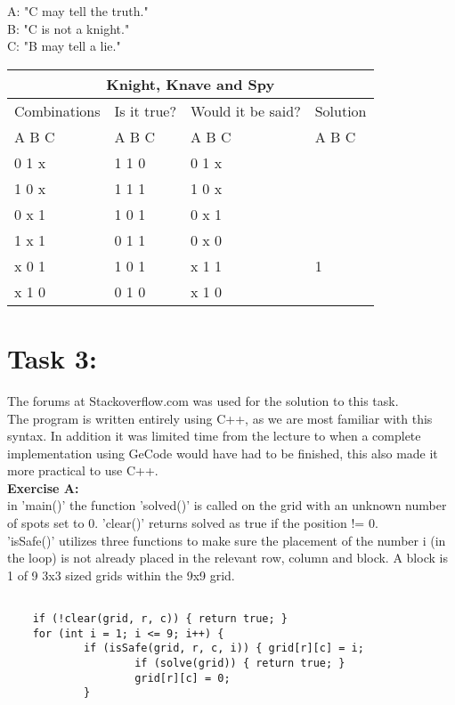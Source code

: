 \documentclass[11pt]{amsart}
\begin{document}
	A: "C may tell the truth."\\
	B: "C is not a knight."\\
	C: "B may tell a lie." \\


\begin{tabular}{ |p{3cm}||p{3cm}|p{3cm}|p{3cm}|  }
	\hline
	\multicolumn{4}{|c|}{Knight, Knave and Spy} \\
	\hline
	 Combinations & Is it true? & Would it be said? & Solution  \\ A  B  C   &   A  B  C  &   A  B  C & A  B  C \\
	\hline
	  0   1   x  	& 1	1	0   & 0 1 x	&  \\
	  1   0   x		& 1	1	1  	& 1 0 x &  \\
	  0   x   1 	&	1	0	1 	& 0 x 1	&  \\
	  1   x   1  	&	0	1	1 	& 0 x 0	&  \\
	  x   0   1		& 1	0	1  	& x 1 1	& 1\\
	  x   1   0		& 0	1	0  	& x 1 0 &  \\

	\hline
\end{tabular}


\section{Task 3:}

The forums at Stackoverflow.com was used for the solution to this task. \\

The program is written entirely using C++, as we are most familiar with this syntax.
In addition it was limited time from the lecture to when a complete
implementation using GeCode would have had to be finished, this also made it more practical to use C++. \\

\textbf{Exercise A:} \\

in 'main()' the function 'solved()' is called on the grid with an unknown number of
spots set to 0. 'clear()' returns solved as true if the position != 0. \\
'isSafe()' utilizes three functions to make sure the placement of the number i (in the loop) is
not already placed in the relevant row, column and block. A block is 1 of 9 3x3 sized grids within
the 9x9 grid. \\


\begin{verbatim}

 	if (!clear(grid, r, c)) { return true; }
 	for (int i = 1; i <= 9; i++) {
 			if (isSafe(grid, r, c, i)) { grid[r][c] = i;
 					if (solve(grid)) { return true; }
 					grid[r][c] = 0;
 			}


\end{verbatim}
\end{document}
